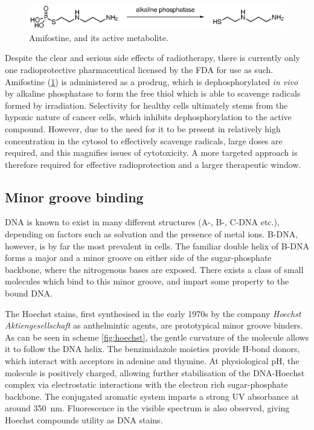 \begin{refsection}
\begin{figure}
\centering
\includegraphics[scale=0.74]{Figures/amifostine.eps}
\caption{Amifostine, and its active metabolite.}
\label{fig:amifostine}
\end{figure}

Despite the clear and serious side effects of radiotherapy, there is currently only one radioprotective pharmaceutical licensed by the FDA for use as such.
Amifostine (\cref{fig:amifostine}) is administered as a prodrug, which is dephosphorylated \emph{in vivo} by alkaline phosphatase to form the free thiol which is able to scavenge radicals formed by irradiation.
Selectivity for healthy cells ultimately stems from the hypoxic nature of cancer cells, which inhibits dephosphorylation to the active compound\autocite{Kouvaris2007}.
However, due to the need for it to be present in relatively high concentration in the cytosol to effectively scavenge radicals, large doses are required, and this magnifies issues of cytotoxicity.
A more targeted approach is therefore required for effective radioprotection and a larger therapeutic window.

\subsection{Minor groove binding}
DNA is known to exist in many different structures (A-, B-, C-DNA etc.), depending on factors such as solvation and the presence of metal ions.
B-DNA, however, is by far the most prevalent in cells\autocite{Miyahara2012}.
The familiar double helix of B-DNA forms a major and a minor groove on either side of the sugar-phosphate backbone, where the nitrogenous bases are exposed.
There exists a class of small molecules which bind to this minor groove, and impart some property to the bound DNA.

The Hoechst stains, first synthesised in the early 1970s by the company \emph{Hoechst Aktiengesellschaft} as anthelmintic agents, are prototypical minor groove binders.
As can be seen in scheme \cref{fig:hoechst}, the gentle curvature of the molecule allows it to follow the DNA helix.
The benzimidazole moieties provide H-bond donors, which interact with acceptors in adenine and thymine.
At physiological pH, the molecule is positively charged, allowing further stabilisation of the DNA-Hoechst complex via electrostatic interactions with the electron rich sugar-phosphate backbone\autocite{Teng1988}.
The conjugated aromatic system imparts a strong UV absorbance at around \SI{350}{\nm}. Fluorescence in the visible spectrum is also observed, giving Hoechst compounds utility as DNA stains.


\end{refsection}
